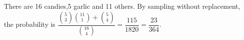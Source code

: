 There are 16 candies,5 garlic and 11 others. By sampling without replacement, the probability is $\dfrac{\binom53\binom{11}1+\binom54}{\binom{16}4}=\dfrac{115}{1820}=\boxed{\dfrac{23}{364}}$.
